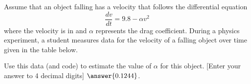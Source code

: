 \documentclass{ximera}
\begin{document}
\newpage

\begin{exercise}\label{ex:ModelingParamVel}%
    Assume that an object falling has a velocity that follows the differential equation 
    \begin{equation*}
        \frac{dv}{dt} = 9.8 - \alpha v^2
    \end{equation*}
    where the velocity is in  and $\alpha$ represents the drag coefficient. During a physics experiment, a student measures data for the velocity of a falling object over time given in the table below.
    
    Use this data (and code) to estimate the value of $\alpha$ for this object.  [Enter your answer to 4 decimal digits] $\answer{0.1244}$.
\end{exercise} 
\end{document}
